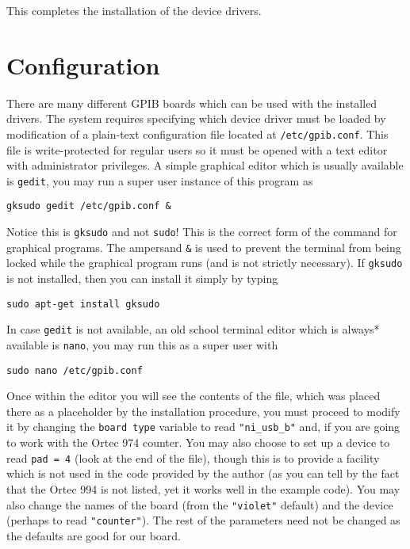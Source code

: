 \documentclass[letterpaper,11pt]{article}
\begin{document}
This completes the installation of the device drivers.

\section{Configuration}
There are many different GPIB boards which can be used with the installed drivers. The system requires specifying which device driver must be loaded by modification of a plain-text configuration file located at \texttt{/etc/gpib.conf}. This file is write-protected for regular users so it must be opened with a text editor with administrator privileges. A simple graphical editor which is usually available is  \texttt{gedit}, you may run a super user instance of this program as
\begin{verbatim}
gksudo gedit /etc/gpib.conf &
 \end{verbatim}
Notice this is  \texttt{gksudo} and not \texttt{sudo}! This is the correct form of the command for graphical programs. The ampersand \texttt{\&} is used to prevent the terminal from being locked while the graphical program runs (and is not strictly necessary). If \texttt{gksudo} is not installed, then you can install it simply by typing
\begin{verbatim}
sudo apt-get install gksudo
 \end{verbatim}

In case  \texttt{gedit} is not available, an old school terminal editor which is always* available is \texttt{nano}, you may run this as a super user with
\begin{verbatim}
sudo nano /etc/gpib.conf
\end{verbatim}
Once within the editor you will see the contents of the file, which was placed there as a placeholder by the installation procedure, you must proceed to modify it by changing the \texttt{board type} variable to read \texttt{"ni\_usb\_b"} and, if you are going to work with the Ortec 974 counter. You may also choose to set up a device to read \texttt{pad = 4} (look at the end of the file), though this is to provide a facility which is not used in the code provided by the author (as you can tell by the fact that the Ortec 994 is not listed, yet it works well in the example code). You may also change the names of the board (from the \texttt{"violet"} default) and the device (perhaps to read \texttt{"counter"}). The rest of the parameters need not be changed as the defaults are good for our board.
\end{document}
